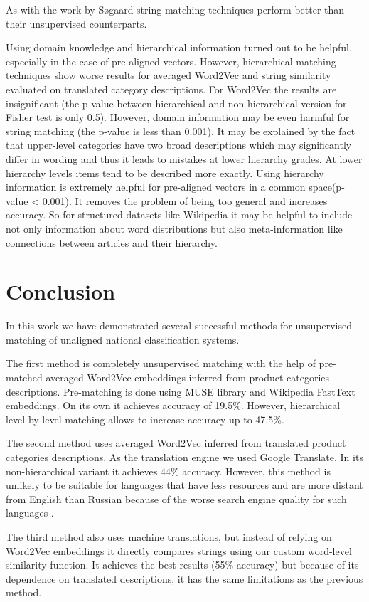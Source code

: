 \documentclass[11pt,a4paper]{article}
\begin{document}
As with the work by Søgaard string matching techniques perform better than their unsupervised counterparts.

Using domain knowledge and hierarchical information turned out to be helpful, especially in the case of pre-aligned vectors. However, hierarchical matching techniques show worse results for averaged Word2Vec and string similarity evaluated on translated category descriptions. For Word2Vec the results are insignificant (the p-value between hierarchical and non-hierarchical version for Fisher test is only 0.5). However, domain information may be even harmful for string matching (the p-value is less than 0.001). It may be explained by the fact that upper-level categories have two broad descriptions which may significantly differ in wording and thus it leads to mistakes at lower hierarchy grades. At lower hierarchy levels items tend to be described more exactly. Using hierarchy information is extremely helpful for pre-aligned vectors in a common space(p-value < 0.001). It removes the problem of being too general and increases accuracy. So for structured datasets like Wikipedia it may be helpful to include not only information about word distributions but also meta-information like connections between articles and their hierarchy.

\section{Conclusion}
In this work we have demonstrated several successful methods for unsupervised matching of unaligned national classification systems. 

The first method is completely unsupervised matching with the help of pre-matched averaged Word2Vec embeddings inferred from product categories descriptions. Pre-matching is done using MUSE library and Wikipedia FastText embeddings. On its own it achieves accuracy of 19.5\%. However, hierarchical level-by-level matching allows to increase accuracy up to 47.5\%.

The second method uses averaged Word2Vec inferred from translated product categories descriptions. As the translation engine we used Google Translate. In its non-hierarchical variant it achieves 44\% accuracy. However, this method is unlikely to be suitable for languages that have less resources and are more distant from English than Russian because of the worse search engine quality for such languages \cite{google-translate-rare}.

The third method also uses machine translations, but instead of relying on Word2Vec embeddings it directly compares strings using our custom word-level similarity function. It achieves the best results (55\% accuracy) but because of its dependence on translated descriptions, it has the same limitations as the previous method.
\end{document}
